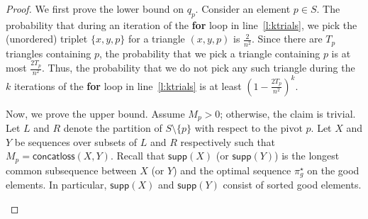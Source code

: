 \documentclass[11pt]{llncs}
\newcommand{\supp}{{\textsf{supp}}}
\newcommand{\conloss}{{\textsf{concatloss}}}
\begin{document}
\begin{proof}
    We first prove the lower bound on $q_p$. Consider an element $p \in S$.  The probability that during an iteration of the {\bf for} loop in line~\ref{l:ktrials}, we pick the (unordered) triplet $\{x,y,p\}$ for a triangle $(x,y,p)$ is $\frac{2}{n^2}$. Since there are $T_p$ triangles containing $p$, the probability that we pick a triangle containing $p$ is at most $\frac{2T_p}{n^2}$. Thus, the probability that we do not pick any such triangle during the $k$ iterations of the {\bf for} loop in line~\ref{l:ktrials} is at least $\left( 1 - \frac{2T_p}{n^2} \right)^k.$

Now, we prove the upper bound. Assume $M_p > 0$; otherwise, the claim is trivial.  Let $L$ and $R$ denote the partition of $S \setminus \{p\}$ with respect to the pivot $p$. Let $X$ and $Y$ be sequences over subsets of $L$ and $R$ respectively such that $M_p = \conloss(X,Y)$. Recall that $\supp(X)$ (or $\supp(Y)$) is the longest common subsequence between $X$ (or $Y$) and the optimal sequence $\pi^\star_g$ on the good elements. In particular, $\supp(X)$ and $\supp(Y)$ consist of sorted good elements.
\begin{figure}[h]
    \centering
{}
\end{figure}
\end{proof}
\end{document}
